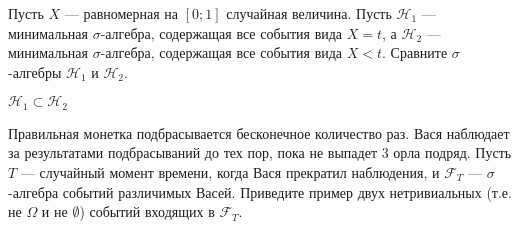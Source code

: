 \begin{problem}
Пусть $X$ — равномерная на $ [0;1] $ случайная величина. Пусть $ \mathcal{H}_{1} $ — минимальная $ \sigma $-алгебра, содержащая все события вида $ X=t $, а $ \mathcal{H}_{2} $ — минимальная $ \sigma $-алгебра, содержащая все события вида $X<t$. Сравните $\sigma$-алгебры $ \mathcal{H}_{1} $ и $ \mathcal{H}_{2} $.

\begin{sol}
$ \mathcal{H}_{1} \subset \mathcal{H}_{2} $
\end{sol}
\end{problem}

\begin{problem}
Правильная монетка подбрасывается бесконечное количество раз. Вася наблюдает за результатами подбрасываний до тех пор, пока не выпадет 3 орла подряд. Пусть $ T $ — случайный момент времени, когда Вася прекратил наблюдения, и $ \mathcal{F}_{T} $ — $ \sigma $-алгебра событий различимых Васей. Приведите пример двух нетривиальных (т.е. не $ \Omega $ и не $ \emptyset $) событий входящих в $ \mathcal{F}_{T} $.

\begin{sol}

\end{sol}
\end{problem}

